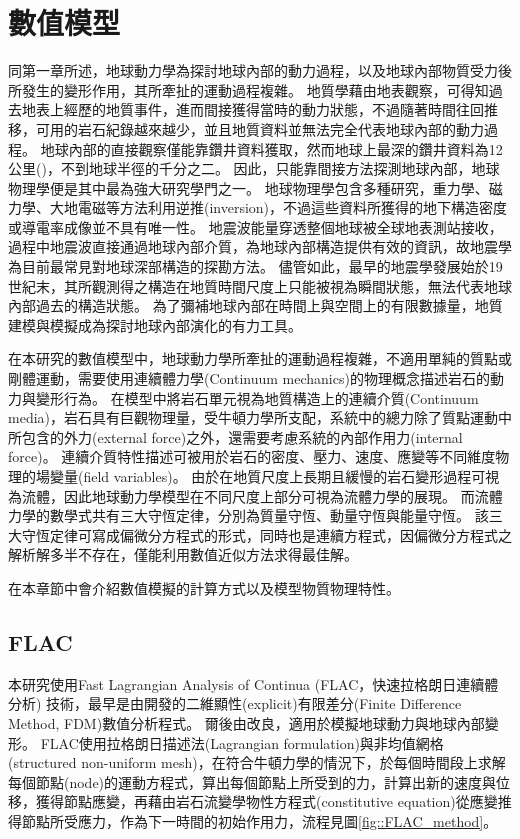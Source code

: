 
\chapter{數值模型}

同第一章所述，地球動力學為探討地球內部的動力過程，以及地球內部物質受力後所發生的變形作用，其所牽扯的運動過程複雜。
地質學藉由地表觀察，可得知過去地表上經歷的地質事件，進而間接獲得當時的動力狀態，不過隨著時間往回推移，可用的岩石紀錄越來越少，並且地質資料並無法完全代表地球內部的動力過程。
地球內部的直接觀察僅能靠鑽井資料獲取，然而地球上最深的鑽井資料為12公里(\citealp{ganchin1998seismic})，不到地球半徑的千分之二。
因此，只能靠間接方法探測地球內部，地球物理學便是其中最為強大研究學門之一。
地球物理學包含多種研究，重力學、磁力學、大地電磁等方法利用逆推(inversion)，不過這些資料所獲得的地下構造密度或導電率成像並不具有唯一性。
地震波能量穿透整個地球被全球地表測站接收，過程中地震波直接通過地球內部介質，為地球內部構造提供有效的資訊，故地震學為目前最常見對地球深部構造的探勘方法。
儘管如此，最早的地震學發展始於19世紀末，其所觀測得之構造在地質時間尺度上只能被視為瞬間狀態，無法代表地球內部過去的構造狀態。
為了彌補地球內部在時間上與空間上的有限數據量，地質建模與模擬成為探討地球內部演化的有力工具。

在本研究的數值模型中，地球動力學所牽扯的運動過程複雜，不適用單純的質點或剛體運動，需要使用連續體力學(Continuum mechanics)的物理概念描述岩石的動力與變形行為。
在模型中將岩石單元視為地質構造上的連續介質(Continuum media)，岩石具有巨觀物理量，受牛頓力學所支配，系統中的總力除了質點運動中所包含的外力(external force)之外，還需要考慮系統的內部作用力(internal force)。
連續介質特性描述可被用於岩石的密度、壓力、速度、應變等不同維度物理的場變量(field variables)。
由於在地質尺度上長期且緩慢的岩石變形過程可視為流體，因此地球動力學模型在不同尺度上部分可視為流體力學的展現。
而流體力學的數學式共有三大守恆定律，分別為質量守恆、動量守恆與能量守恆。
該三大守恆定律可寫成偏微分方程式的形式，同時也是連續方程式，因偏微分方程式之解析解多半不存在，僅能利用數值近似方法求得最佳解。

在本章節中會介紹數值模擬的計算方式以及模型物質物理特性。

\section{FLAC}

本研究使用Fast Lagrangian Analysis of Continua (FLAC，快速拉格朗日連續體分析) 技術，最早是由\citet{cundall1989numerical}開發的二維顯性(explicit)有限差分(Finite Difference Method, FDM)數值分析程式。
爾後由\citet{Lavier2000}改良，適用於模擬地球動力與地球內部變形。
FLAC使用拉格朗日描述法(Lagrangian formulation)與非均值網格(structured non-uniform mesh)，在符合牛頓力學的情況下，於每個時間段上求解每個節點(node)的運動方程式，算出每個節點上所受到的力，計算出新的速度與位移，獲得節點應變，再藉由岩石流變學物性方程式(constitutive equation)從應變推得節點所受應力，作為下一時間的初始作用力，流程見圖\ref{fig::FLAC_method}。

